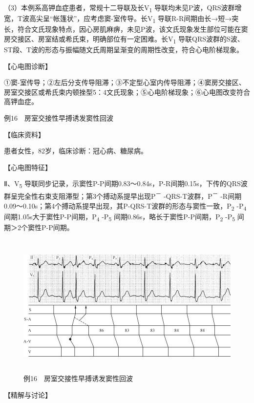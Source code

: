 （3）本例系高钾血症患者，常规十二导联及长V\textsubscript{1}
导联均未见P波，QRS波群增宽，T波高尖呈“帐篷状”，应考虑窦-室传导。长V\textsubscript{1}
导联R-R间期由长→短→突长，符合文氏现象特点，因心房肌麻痹，未见P波，该文氏现象发生部位可能在窦房交接区、房室结或希氏束，明确部位有一定困难。长V\textsubscript{1}
导联QRS波群的S波、ST段、T波的形态与振幅随文氏周期呈渐变的周期性改变，符合心电阶梯现象。

【心电图诊断】

①窦-室传导；②左后分支传导阻滞；③不定型心室内传导阻滞；④窦房交接区、房室交接区或希氏束内顿挫型5：4文氏现象；⑤心电阶梯现象；⑥心电图改变符合高钾血症。

例16　房室交接性早搏诱发窦性回波

【临床资料】

患者女性，82岁，临床诊断：冠心病、糖尿病。

【心电图特征】

Ⅱ、V\textsubscript{5}
导联同步记录，示窦性P-P间期0.83～0.84s，P-R间期0.15s，下传的QRS波群呈完全性右束支阻滞型；第3个搏动系提早出现P\textsuperscript{－}
-QRS-T波群，P\textsuperscript{－}
-R间期0.09～0.10s；第4个搏动系提早出现，其P-QRS-T波群的形态与窦性一致，P\textsubscript{2}
-P\textsubscript{4} 间期1.05s大于窦性P-P间期，P\textsubscript{4}
-P\textsubscript{5} 间期0.86s，略长于窦性P-P间期，P\textsubscript{2}
-P\textsubscript{5} 间期＞2个窦性P-P间期。

\begin{figure}[!htbp]
 \centering
 \includegraphics[width=5.72917in,height=2.82292in]{./images/Image00774.jpg}
 \captionsetup{justification=centering}
 \caption{例16　房室交接性早搏诱发窦性回波}
 \label{fig50-16}
  \end{figure} 

【精解与讨论】

